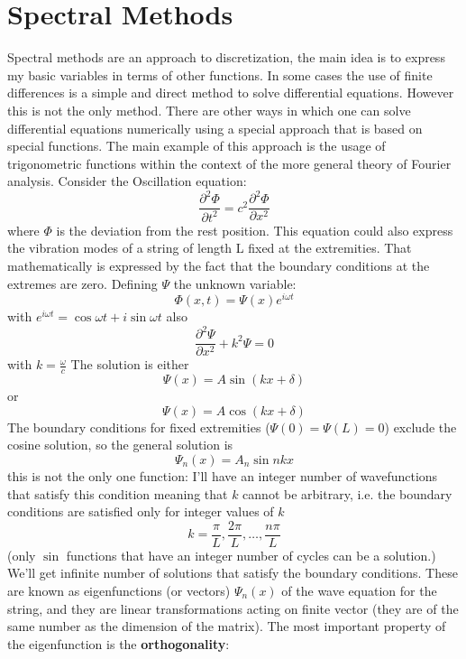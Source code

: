 \section{Spectral Methods}\label{sec:spectral method}
Spectral methods are an approach to discretization, the main idea is to express my basic variables in terms of other functions.
In some cases the use of finite differences is a simple and direct method to solve differential equations. However this is not the only method. There are other ways in which one can solve differential equations numerically using a special approach that is based on special functions. The main example of this approach is the usage of trigonometric functions within the context of the more general theory of Fourier analysis. Consider the Oscillation equation:
\begin{equation}\label{eq:oscillation}
	\frac{\partial^2\Phi}{\partial t^2}=c^2\frac{\partial^2\Phi}{\partial x^2}
\end{equation}
where $\Phi$ is the deviation from the rest position.
This equation could also express the vibration modes of a string of length L fixed at the extremities. That mathematically is expressed by the fact that the boundary conditions at the extremes are zero. Defining $\Psi$ the unknown variable:
\begin{equation}
	\Phi(x,t)=\Psi(x)e^{i\omega t}
\end{equation}
with $e^{i\omega t}=\cos \omega t+i\sin\omega t$
also
\begin{equation}
	\frac{\partial^2\Psi}{\partial x^2}+k^2\Psi=0
\end{equation} with $k=\frac{\omega}{c}$
The solution is either $$\Psi(x)=A\sin(kx+\delta)$$
or $$\Psi(x)=A\cos(kx+\delta)$$
The boundary conditions for fixed extremities ($\Psi(0)=\Psi(L)=0$) exclude the cosine solution, so the general solution is
\begin{equation}\label{psin}
	\Psi_n(x)=A_n\sin{nk x}
\end{equation}
this is not the only one function: I'll have an integer number of wavefunctions that satisfy this condition meaning that $k$ cannot be arbitrary, i.e. the boundary conditions are satisfied only for integer values of $k$
$$k=\frac{\pi}{L}, \frac{2\pi}{L}, \dots, \frac{n\pi}{L}$$
(only $\sin$ functions that have an integer number of cycles can be a solution.)  We'll get infinite number of solutions that satisfy the boundary conditions. These are known as eigenfunctions (or vectors) $\Psi_n(x)$ of the wave equation for the string, and they are linear transformations acting on finite vector (they are of the same number as the dimension of the matrix). The most important property of the eigenfunction is the \textbf{orthogonality}:
